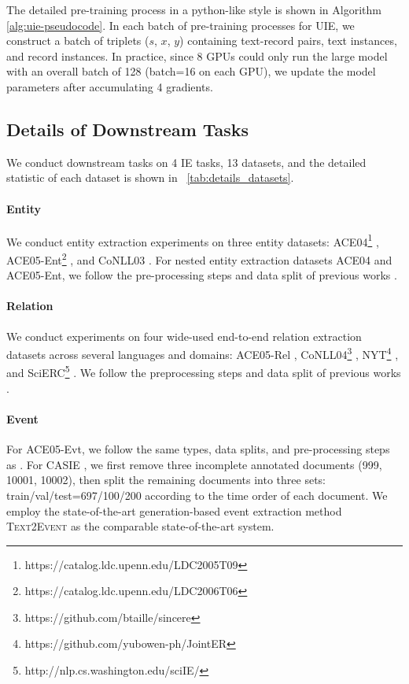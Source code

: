 \documentclass[11pt]{article}
\begin{document}
The detailed pre-training process in a python-like style is shown in Algorithm \ref{alg:uie-pseudocode}.
In each batch of pre-training processes for UIE, we construct a batch of triplets ($s$, $x$, $y$) containing text-record pairs, text instances, and record instances.
In practice, since 8 GPUs could only run the large model with an overall batch of 128 (batch=16 on each GPU), we update the model parameters after accumulating 4 gradients.

\subsection{Details of Downstream Tasks} \label{sec:downstream_tasks}

We conduct downstream tasks on 4 IE tasks, 13 datasets, and the detailed statistic of each dataset is shown in \tablename~\ref{tab:details_datasets}.

\paragraph{Entity}
We conduct entity extraction experiments on three entity datasets: 
ACE04\footnote{https://catalog.ldc.upenn.edu/LDC2005T09} \citep{ace2004-annotation}, ACE05-Ent\footnote{https://catalog.ldc.upenn.edu/LDC2006T06} \citep{ace2005-annotation}, 
and CoNLL03 \citep{tjongkimsang2003conll}.
For nested entity extraction datasets ACE04 and ACE05-Ent, we follow the pre-processing steps and data split of previous works \cite{li-etal-2020-unified}.

\paragraph{Relation}
We conduct experiments on four wide-used end-to-end relation extraction datasets across several languages and domains: ACE05-Rel \citep{ace2005-annotation}, CoNLL04\footnote{https://github.com/btaille/sincere} \citep{roth-yih-2004-linear}, NYT\footnote{https://github.com/yubowen-ph/JointER} \citep{10.1007/978-3-642-15939-8_10}, and SciERC\footnote{http://nlp.cs.washington.edu/sciIE/} \citep{luan-etal-2018-multi}.
We follow the preprocessing steps and data split of previous works \citep{taille-etal-2020-lets,yu2020jointer,wadden-etal-2019-entity}.

\paragraph{Event}
For ACE05-Evt, we follow the same types, data splits, and pre-processing steps as \citet{lin-etal-2020-joint}.
For CASIE \citep{Satyapanich_Ferraro_Finin_2020}, we first remove three incomplete annotated documents (999, 10001, 10002), then split the remaining documents into three sets: train/val/test=697/100/200 according to the time order of each document.
We employ the state-of-the-art generation-based event extraction method \textsc{Text2Event} \citep{lu-etal-2021-text2event} as the comparable state-of-the-art system.
\end{document}
